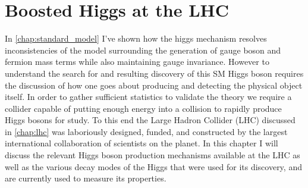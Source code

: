 \chapter{Boosted Higgs at the LHC} \label{chap:higgs}

In \cref{chap:standard_model} I've shown how the higgs mechanism resolves
inconsistencies of the model surrounding the generation of gauge boson and
fermion mass terms while also maintaining gauge invariance.  However to
understand the search for and resulting discovery of this SM Higgs boson
requires the discussion of how one goes about producing and detecting the
physical object itself.  In order to gather sufficient statistics to validate
the theory we require a collider capable of putting enough energy into a
collision to rapidly produce Higgs bosons for study.  To this end the Large
Hadron Collider (LHC) discussed in \cref{chap:lhc} was laboriously
designed, funded, and constructed by the largest international collaboration of
scientists on the planet. In this chapter I will discuss the relevant Higgs
boson production mechanisms available at the LHC as well as the various decay
modes of the Higgs that were used for its discovery, and are currently used to
measure its properties.






